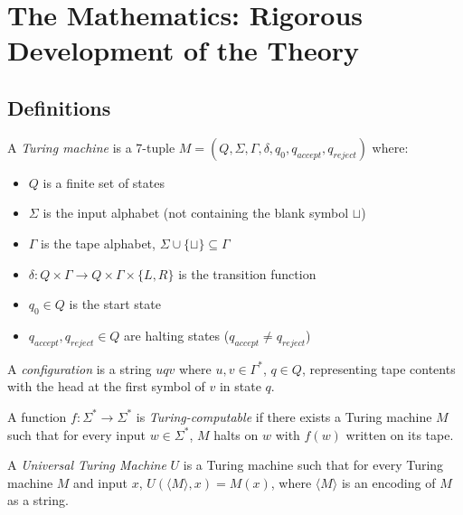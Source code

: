 \section{The Mathematics: Rigorous Development of the Theory}
\label{sec:computation:math}

\subsection{Definitions}
\label{sec:computation:definitions}

\begin{definition}
A \emph{Turing machine} is a 7-tuple $M = (Q, \Sigma, \Gamma, \delta, q_0, q_{accept}, q_{reject})$ where:
\begin{itemize}
\item $Q$ is a finite set of states
\item $\Sigma$ is the input alphabet (not containing the blank symbol $\sqcup$)
\item $\Gamma$ is the tape alphabet, $\Sigma \cup \{\sqcup\} \subseteq \Gamma$
\item $\delta: Q \times \Gamma \to Q \times \Gamma \times \{L, R\}$ is the transition function
\item $q_0 \in Q$ is the start state
\item $q_{accept}, q_{reject} \in Q$ are halting states ($q_{accept} \neq q_{reject}$)
\end{itemize}
A \emph{configuration} is a string $uqv$ where $u,v \in \Gamma^*$, $q \in Q$, representing tape contents with the head at the first symbol of $v$ in state $q$.
\end{definition}

\begin{definition}
A function $f: \Sigma^* \to \Sigma^*$ is \emph{Turing-computable} if there exists a Turing machine $M$ such that for every input $w \in \Sigma^*$, $M$ halts on $w$ with $f(w)$ written on its tape.
\end{definition}

\begin{definition}
A \emph{Universal Turing Machine} $U$ is a Turing machine such that for every Turing machine $M$ and input $x$, $U(\langle M \rangle, x) = M(x)$, where $\langle M \rangle$ is an encoding of $M$ as a string.
\end{definition}

